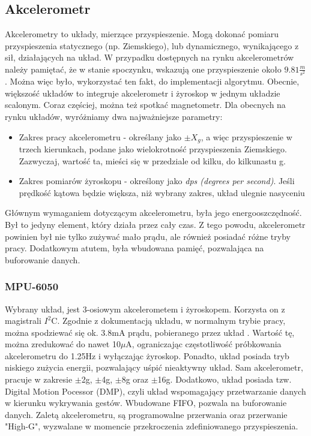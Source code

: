 \subsection{Akcelerometr}
Akcelerometry to układy, mierzące przyspieszenie. Mogą dokonać pomiaru przyspieszenia statycznego (np. Ziemskiego), lub dynamicznego, wynikającego z sił, działających na układ. W przypadku dostępnych na rynku akcelerometrów należy pamiętać, że w stanie spoczynku, wskazują one przyspieszenie około $9.81\frac{m}{s^{2}}$. Można więc było, wykorzystać ten fakt, do implementacji algorytmu.
\newline
Obecnie, większość układów to integruje akcelerometr i żyroskop w jednym układzie scalonym. Coraz częściej, można też spotkać magnetometr. Dla obecnych na rynku układów, wyróżniamy dwa najważniejsze parametry:
\begin{itemize}
    \item Zakres pracy akcelerometru - określany jako $\pm X_{g}$, a więc przyspieszenie w trzech kierunkach, podane jako wielokrotność przyspieszenia Ziemskiego. Zazwyczaj, wartość ta, mieści się w przedziale od kilku, do kilkunastu g.
    \item Zakres pomiarów żyroskopu - określony jako \emph{dps (degrees per second)}. Jeśli prędkość kątowa będzie większa, niż wybrany zakres, układ ulegnie nasyceniu
\end{itemize}
Głównym wymaganiem dotyczącym akcelerometru, była jego energooszczędność. Był to jedyny element, który działa przez cały czas. Z tego powodu, akcelerometr powinien był nie tylko zużywać mało prądu, ale również posiadać różne tryby pracy. Dodatkowym atutem, była wbudowana pamięć, pozwalająca na buforowanie danych.

\subsubsection{MPU-6050}
Wybrany układ, jest 3-osiowym akcelerometem i żyroskopem. Korzysta on z magistrali $I^{2}$C. Zgodnie z dokumentacją układu, w normalnym trybie pracy, można spodziewać się ok. 3.8mA prądu, pobieranego przez układ \cite{MPU6050}. Wartość tę, można zredukować do nawet 10$\mu$A, ograniczając częstotliwość próbkowania akcelerometru do 1.25Hz i wyłączając żyroskop. Ponadto, układ posiada tryb niskiego zużycia energii, pozwalający uśpić nieaktywny układ. Sam akcelerometr, pracuje w zakresie $\pm$2g, $\pm$4g, $\pm$8g oraz $\pm$16g. Dodatkowo, układ posiada tzw. Digital Motion Pocessor (DMP), czyli układ wspomagający przetwarzanie danych w kierunku wykrywania gestów. Wbudowane FIFO, pozwala na buforowanie danych. Zaletą akcelerometru, są programowalne przerwania oraz przerwanie "High-G", wyzwalane w momencie przekroczenia zdefiniowanego przyspieszenia.

